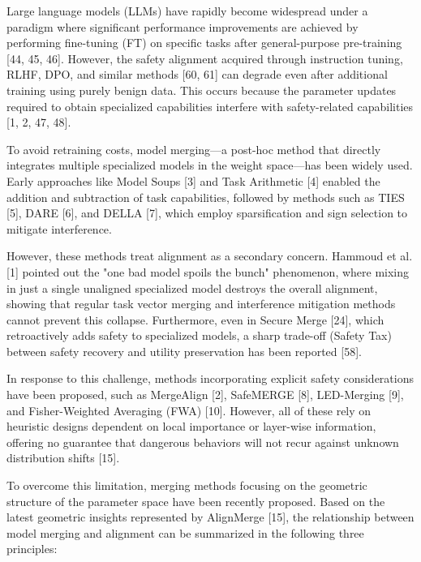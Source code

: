 \documentclass{article}
\begin{document}

Large language models (LLMs) have rapidly become widespread under a paradigm where significant performance improvements are achieved by performing fine-tuning (FT) on specific tasks after general-purpose pre-training [44, 45, 46]. However, the safety alignment acquired through instruction tuning, RLHF, DPO, and similar methods [60, 61] can degrade even after additional training using purely benign data. This occurs because the parameter updates required to obtain specialized capabilities interfere with safety-related capabilities [1, 2, 47, 48].

To avoid retraining costs, model merging---a post-hoc method that directly integrates multiple specialized models in the weight space---has been widely used. Early approaches like Model Soups [3] and Task Arithmetic [4] enabled the addition and subtraction of task capabilities, followed by methods such as TIES [5], DARE [6], and DELLA [7], which employ sparsification and sign selection to mitigate interference.

However, these methods treat alignment as a secondary concern. Hammoud et al. [1] pointed out the "one bad model spoils the bunch" phenomenon, where mixing in just a single unaligned specialized model destroys the overall alignment, showing that regular task vector merging and interference mitigation methods cannot prevent this collapse. Furthermore, even in Secure Merge [24], which retroactively adds safety to specialized models, a sharp trade-off (Safety Tax) between safety recovery and utility preservation has been reported [58].

In response to this challenge, methods incorporating explicit safety considerations have been proposed, such as MergeAlign [2], SafeMERGE [8], LED-Merging [9], and Fisher-Weighted Averaging (FWA) [10]. However, all of these rely on heuristic designs dependent on local importance or layer-wise information, offering no guarantee that dangerous behaviors will not recur against unknown distribution shifts [15].

To overcome this limitation, merging methods focusing on the geometric structure of the parameter space have been recently proposed. Based on the latest geometric insights represented by AlignMerge [15], the relationship between model merging and alignment can be summarized in the following three principles:
\end{document}

